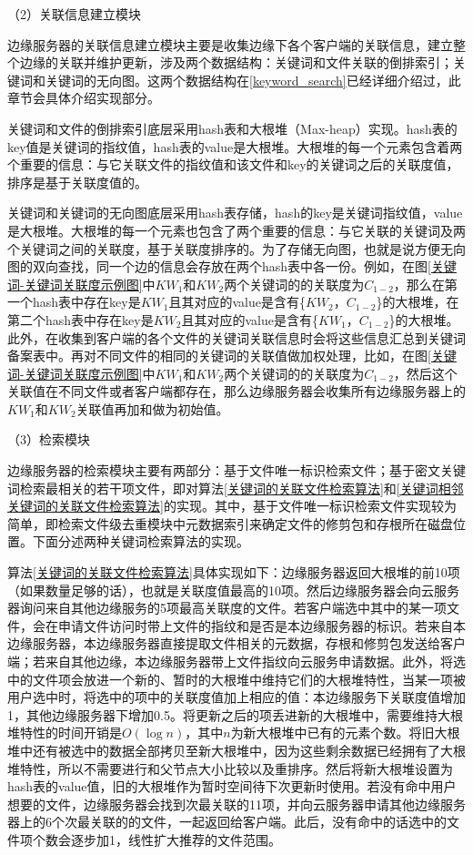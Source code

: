 \documentclass[promaster]{thesis-uestc}
\begin{document}
（2）关联信息建立模块

边缘服务器的关联信息建立模块主要是收集边缘下各个客户端的关联信息，建立整个边缘的关联并维护更新，涉及两个数据结构：关键词和文件关联的倒排索引；关键词和关键词的无向图。这两个数据结构在\ref{keyword_search}已经详细介绍过，此章节会具体介绍实现部分。

关键词和文件的倒排索引底层采用hash表和大根堆（Max-heap）实现。hash表的key值是关键词的指纹值，hash表的value是大根堆。大根堆的每一个元素包含着两个重要的信息：与它关联文件的指纹值和该文件和key的关键词之后的关联度值，排序是基于关联度值的。

关键词和关键词的无向图底层采用hash表存储，hash的key是关键词指纹值，value是大根堆。大根堆的每一个元素也包含了两个重要的信息：与它关联的关键词及两个关键词之间的关联度，基于关联度排序的。为了存储无向图，也就是说方便无向图的双向查找，同一个边的信息会存放在两个hash表中各一份。例如，在图\ref{关键词-关键词关联度示例图}中$KW_1$和$KW_2$两个关键词的的关联度为$C_{1-2}$，那么在第一个hash表中存在key是$KW_1$且其对应的value是含有\{$KW_2$，$C_{1-2}$\}的大根堆，在第二个hash表中存在key是$KW_2$且其对应的value是含有\{$KW_1$，$C_{1-2}$\}的大根堆。此外，在收集到客户端的各个文件的关键词关联信息时会将这些信息汇总到关键词备案表中。再对不同文件的相同的关键词的关联值做加权处理，比如，在图\ref{关键词-关键词关联度示例图}中$KW_1$和$KW_2$两个关键词的的关联度为$C_{1-2}$，然后这个关联值在不同文件或者客户端都存在，那么边缘服务器会收集所有边缘服务器上的$KW_1$和$KW_2$关联值再加和做为初始值。

（3）检索模块

边缘服务器的检索模块主要有两部分：基于文件唯一标识检索文件；基于密文关键词检索最相关的若干项文件，即对算法\ref{关键词的关联文件检索算法}和\ref{关键词相邻关键词的关联文件检索算法}的实现。其中，基于文件唯一标识检索文件实现较为简单，即检索文件级去重模块中元数据索引来确定文件的修剪包和存根所在磁盘位置。下面分述两种关键词检索算法的实现。

算法\ref{关键词的关联文件检索算法}具体实现如下：边缘服务器返回大根堆的前10项（如果数量足够的话），也就是关联度值最高的10项。然后边缘服务器会向云服务器询问来自其他边缘服务的5项最高关联度的文件。若客户端选中其中的某一项文件，会在申请文件访问时带上文件的指纹和是否是本边缘服务器的标识。若来自本边缘服务器，本边缘服务器直接提取文件相关的元数据，存根和修剪包发送给客户端；若来自其他边缘，本边缘服务器带上文件指纹向云服务申请数据。此外，将选中的文件项会放进一个新的、暂时的大根堆中维持它们的大根堆特性，当某一项被用户选中时，将选中的项中的关联度值加上相应的值：本边缘服务下关联度值增加1，其他边缘服务器下增加0.5。将更新之后的项丢进新的大根堆中，需要维持大根堆特性的时间开销是$O(\log n)$，其中$n$为新大根堆中已有的元素个数。将旧大根堆中还有被选中的数据全部拷贝至新大根堆中，因为这些剩余数据已经拥有了大根堆特性，所以不需要进行和父节点大小比较以及重排序。然后将新大根堆设置为hash表的value值，旧的大根堆作为暂时空间待下次更新时使用。若没有命中用户想要的文件，边缘服务器会找到次最关联的11项，并向云服务器申请其他边缘服务器上的6个次最关联的的文件，一起返回给客户端。此后，没有命中的话选中的文件项个数会逐步加1，线性扩大推荐的文件范围。
\end{document}
